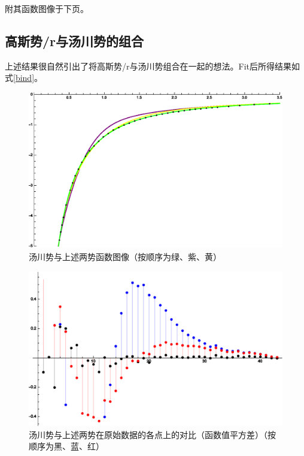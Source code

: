 \documentclass[hyperref]{ctexart}
\begin{document}
附其函数图像于下页。
\subsection{高斯势/r与汤川势的组合}
上述结果很自然引出了将高斯势/r与汤川势组合在一起的想法。Fit后所得结果如式\eqref{bind}。

\begin{figure}[!htbp]
  \centering
  \includegraphics[width=5.2in]{Test_BindingEnergy_FitOtherwise.eps}
  \caption{汤川势与上述两势函数图像（按顺序为绿、紫、黄）}
\end{figure}

\begin{figure}[!htbp]
  \centering
  \includegraphics[width=5.2in]{Test_BindingEnergy_FitOtherwise1.eps}
  \caption{汤川势与上述两势在原始数据的各点上的对比（函数值平方差）（按顺序为黑、蓝、红）}
\end{figure}
\end{document}

